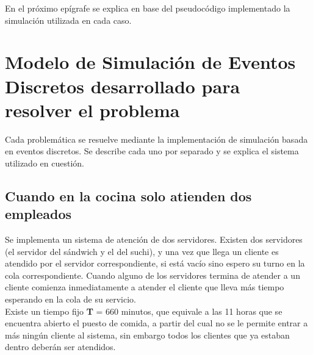 \documentclass{book}
\begin{document}
	En el pr\'oximo ep\'igrafe se explica en base del pseudoc\'odigo implementado la simulaci\'on utilizada en cada caso.
	
	\section{Modelo de Simulaci\'on de Eventos Discretos desarrollado para resolver el problema}
	Cada problem\'atica se resuelve mediante la implementaci\'on de simulaci\'on basada en eventos discretos. Se describe cada uno por separado y se explica el sistema utilizado en cuesti\'on.
		\subsection{Cuando en la cocina solo atienden dos empleados}
			Se implementa un sistema de atenci\'on de dos servidores. Existen dos servidores (el servidor del s\'andwich y el del suchi), y una vez que llega un cliente es atendido por el servidor correspondiente, si est\'a vac\'io sino espero su turno en la cola correspondiente. Cuando alguno de los servidores termina de atender a un cliente comienza inmediatamente a atender el cliente que lleva m\'as tiempo esperando en la cola de su servicio. \\
			Existe un tiempo fijo \textbf{T} = 660 minutos, que equivale a las 11 horas que se encuentra abierto el puesto de comida, a partir del cual no se le permite entrar a m\'as ning\'un cliente al sistema, sin embargo todos los clientes que ya estaban dentro deber\'an ser atendidos. \\
			
\end{document}
